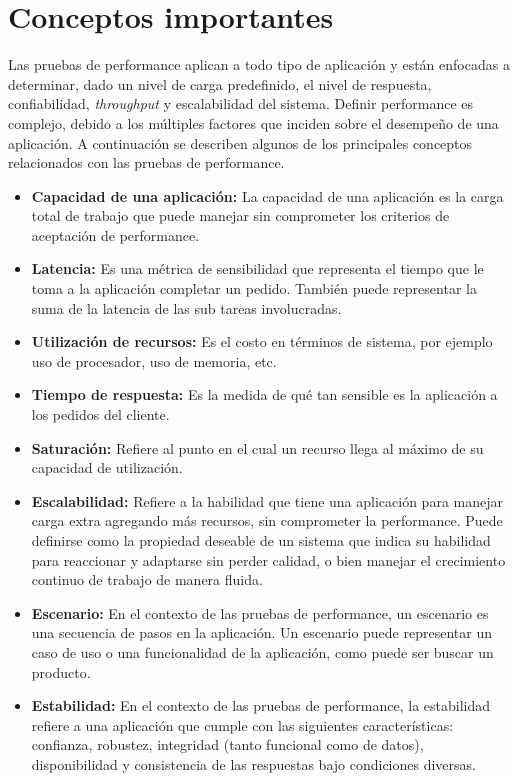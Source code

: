 \section{Conceptos importantes}
\label{capitulo2:conceptos}

Las pruebas de performance aplican a todo tipo de aplicación y están enfocadas a determinar, dado un nivel de carga predefinido, el nivel de respuesta, confiabilidad, \emph{throughput} y escalabilidad del sistema. Definir performance es complejo, debido a los múltiples factores que inciden sobre el desempeño de una aplicación. A continuación se describen algunos de los principales conceptos relacionados con las pruebas de performance.


\begin{itemize}
	\item \textbf{ Capacidad de una aplicación: } La capacidad de una aplicación es la carga total de trabajo que puede manejar sin comprometer los criterios de aceptación de performance.
	\item \textbf{ Latencia: } Es una métrica de sensibilidad que representa el tiempo que le toma a la aplicación completar un pedido. También puede representar la suma de la latencia de las sub tareas involucradas.
	\item \textbf{Utilización de recursos:} Es el costo en términos de sistema, por ejemplo uso de procesador, uso de memoria, etc.
	\item \textbf{Tiempo de respuesta:} Es la medida de qué tan sensible es la aplicación a los pedidos del cliente.
	\item \textbf{Saturación:} Refiere al punto en el cual un recurso llega al máximo de su capacidad de utilización.
	\item \textbf{Escalabilidad:} Refiere a la habilidad que tiene una aplicación para manejar carga extra agregando más recursos, sin comprometer la performance. Puede definirse como la propiedad deseable de un sistema que indica su habilidad para reaccionar y adaptarse sin perder calidad, o bien manejar el crecimiento continuo de trabajo de manera fluida. 
	\item \textbf{Escenario:} En el contexto de las pruebas de performance, un escenario es una secuencia de pasos en la aplicación. Un escenario puede representar un caso de uso o una funcionalidad de la aplicación, como puede ser buscar un producto.
	\item \textbf{Estabilidad:} En el contexto de las pruebas de performance, la estabilidad refiere a una aplicación que cumple con las siguientes características: confianza, robustez, integridad (tanto funcional como de datos), disponibilidad y consistencia de las respuestas bajo condiciones diversas. 

\end{itemize}
